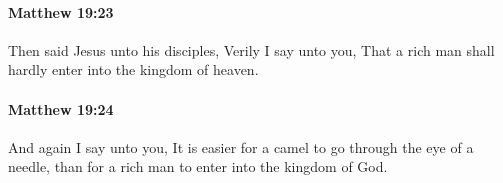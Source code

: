 		\paragraph{Matthew 19:23} %
			\label{MATTHEW-19-23}

			Then said Jesus unto his disciples, Verily I say unto you, That a rich man shall hardly enter into the kingdom of heaven.

			\begin{framed}
			\scriptsize
				\begin{compactdesc}
					\item[SBLG] 
				\end{compactdesc}
			\end{framed}

		\paragraph{Matthew 19:24} %
			\label{MATTHEW-19-24}

			And again I say unto you, It is easier for a camel to go through the eye of a needle, than for a rich man to enter into the kingdom of God.

